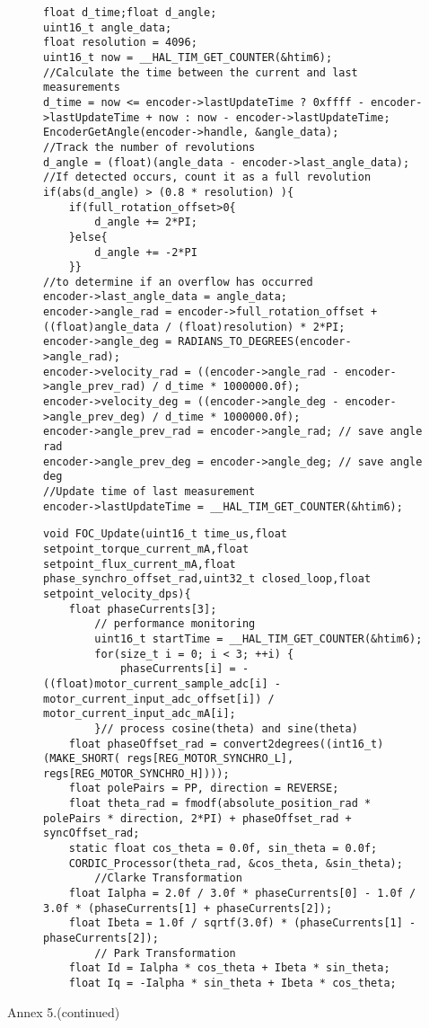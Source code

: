 \begin{figure}[H]
	\centering
	\begin{verbatim}
float d_time;float d_angle;
uint16_t angle_data;
float resolution = 4096;
uint16_t now = __HAL_TIM_GET_COUNTER(&htim6);
//Calculate the time between the current and last measurements
d_time = now <= encoder->lastUpdateTime ? 0xffff - encoder->lastUpdateTime + now : now - encoder->lastUpdateTime;
EncoderGetAngle(encoder->handle, &angle_data);
//Track the number of revolutions
d_angle = (float)(angle_data - encoder->last_angle_data);
//If detected occurs, count it as a full revolution
if(abs(d_angle) > (0.8 * resolution) ){
	if(full_rotation_offset>0{
		d_angle += 2*PI;
	}else{
		d_angle += -2*PI
	}}
//to determine if an overflow has occurred
encoder->last_angle_data = angle_data;
encoder->angle_rad = encoder->full_rotation_offset + ((float)angle_data / (float)resolution) * 2*PI;
encoder->angle_deg = RADIANS_TO_DEGREES(encoder->angle_rad);
encoder->velocity_rad = ((encoder->angle_rad - encoder->angle_prev_rad) / d_time * 1000000.0f);
encoder->velocity_deg = ((encoder->angle_deg - encoder->angle_prev_deg) / d_time * 1000000.0f);
encoder->angle_prev_rad = encoder->angle_rad; // save angle rad
encoder->angle_prev_deg = encoder->angle_deg; // save angle deg
//Update time of last measurement
encoder->lastUpdateTime = __HAL_TIM_GET_COUNTER(&htim6);
	\end{verbatim}

\end{figure}


\newpage
{}


\begin{figure}[H]
	\centering
	\begin{verbatim}
void FOC_Update(uint16_t time_us,float setpoint_torque_current_mA,float setpoint_flux_current_mA,float phase_synchro_offset_rad,uint32_t closed_loop,float setpoint_velocity_dps){
    float phaseCurrents[3];
		// performance monitoring
        uint16_t startTime = __HAL_TIM_GET_COUNTER(&htim6);
        for(size_t i = 0; i < 3; ++i) {
            phaseCurrents[i] = -((float)motor_current_sample_adc[i] - motor_current_input_adc_offset[i]) / motor_current_input_adc_mA[i];
        }// process cosine(theta) and sine(theta)
    float phaseOffset_rad = convert2degrees((int16_t)(MAKE_SHORT( regs[REG_MOTOR_SYNCHRO_L], regs[REG_MOTOR_SYNCHRO_H])));
    float polePairs = PP, direction = REVERSE;
    float theta_rad = fmodf(absolute_position_rad * polePairs * direction, 2*PI) + phaseOffset_rad + syncOffset_rad;
    static float cos_theta = 0.0f, sin_theta = 0.0f;
    CORDIC_Processor(theta_rad, &cos_theta, &sin_theta);
        //Clarke Transformation
    float Ialpha = 2.0f / 3.0f * phaseCurrents[0] - 1.0f / 3.0f * (phaseCurrents[1] + phaseCurrents[2]);
    float Ibeta = 1.0f / sqrtf(3.0f) * (phaseCurrents[1] - phaseCurrents[2]);
		// Park Transformation
	float Id = Ialpha * cos_theta + Ibeta * sin_theta;
    float Iq = -Ialpha * sin_theta + Ibeta * cos_theta;
\end{verbatim}
\end{figure}
\newpage
\hfill \large Annex 5.(continued)

